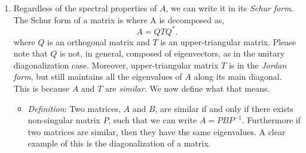 \documentclass[paper=a4, fontsize=11pt]{scrartcl} %
\newtheorem{theorem}{Theorem}
\numberwithin{equation}{section} %
\numberwithin{figure}{section} %
\numberwithin{table}{section} %
\begin{document}
\begin{enumerate}
\begin{itemize}
\begin{proof}
\begin{enumerate}
Hence we have $$ \lambda <\textbf{x},\textbf{y}> =  \mu <\textbf{x},\textbf{y}>,$$ but since we assumed $\mu\neq\lambda$, this implies that $<\textbf{x},\textbf{y}>=0.$\\ 

I have to admit this is a more long winded way to show this property of Hermitian matrices. Since we are assuming $A$ is full rank, we can diagonalize $A$, e.g., let $$A=X\Lambda X^{-1},$$

and now since $A=A^{*}$, we have $$A^{*} = ( X\Lambda X^{-1})^{*} = (X^{-1})^{*} \Lambda^{*} X^{*} = ( X\Lambda X^{-1})^{*} = (X^{-1})^{*} \Lambda X^{*},$$

since all the eigenvalues are real. However this must be equal to the original diagonalization of $A$ because $A$ is Hermitian. Therefore we have that $$X=(X^{-1})^{*} \ \ \ \mbox{ and } \ \ \ X^{-1} = X^{*}.$$

The only way this above statement could be true is if $X^{*}=X^{-1}$, which makes $X$ an orthogonal matrix, and our result falls out. 

\end{enumerate}
\end{proof}

In fact, we can extend this to all matrices that are normal! \\
\begin{theorem} A matrix is unitary diagonalizable if and only if it is normal. \end{theorem}  Recall that a matrix, $A$, is \emph{normal} if $AA^{*} = A^{*}A$.
\end{itemize}


\item Regardless of the spectral properties of $A$, we can write it in its \emph{Schur form}. The Schur form of a matrix is where A is decomposed as, $$A=QTQ^{*}.$$ where $Q$ is an orthogonal matrix and $T$ is an upper-triangular matrix. Please note that $Q$ is not, in general, composed of eigenvectors, as in the unitary diagonalization case. Moreover, upper-triangular matrix $T$ is in the \emph{Jordan form}, but still maintains all the eigenvalues of $A$ along its main diagonal. This is because $A$ and $T$ are \emph{similar}. We now define what that means.

\begin{itemize}
\item \emph{Definition}: Two matrices, $A$ and $B$, are similar if and only if there exists non-singular matrix $P$, such that we can write $A=PBP^{-1}.$ Furthermore if two matrices are similar, then they have the same eigenvalues. A clear example of this is the diagonalization of a matrix. 
\end{itemize}


\end{enumerate}
\end{document}
